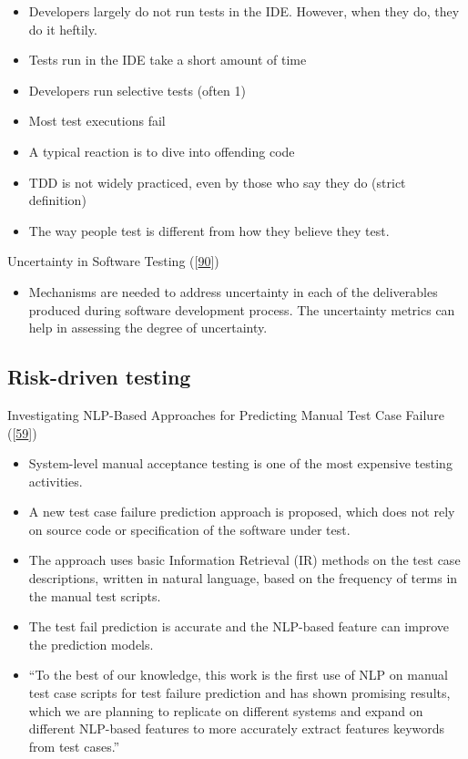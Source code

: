 \documentclass[]{book}
\providecommand{\tightlist}{%
  \setlength{\itemsep}{0pt}\setlength{\parskip}{0pt}}
\begin{document}
\begin{itemize}
\tightlist
\item
  Developers largely do not run tests in the IDE. However, when they do,
  they do it heftily.
\item
  Tests run in the IDE take a short amount of time
\item
  Developers run selective tests (often 1)
\item
  Most test executions fail
\item
  A typical reaction is to dive into offending code
\item
  TDD is not widely practiced, even by those who say they do (strict
  definition)
\item
  The way people test is different from how they believe they test.
\end{itemize}

Uncertainty in Software Testing
({[}\protect\hyperlink{ref-moiz2017uncertainty}{90}{]})

\begin{itemize}
\tightlist
\item
  Mechanisms are needed to address uncertainty in each of the
  deliverables produced during software development process. The
  uncertainty metrics can help in assessing the degree of uncertainty.
\end{itemize}

\subsection{Risk-driven testing}\label{risk-driven-testing}

Investigating NLP-Based Approaches for Predicting Manual Test Case
Failure ({[}\protect\hyperlink{ref-hemmati2018}{59}{]})

\begin{itemize}
\tightlist
\item
  System-level manual acceptance testing is one of the most expensive
  testing activities.
\item
  A new test case failure prediction approach is proposed, which does
  not rely on source code or specification of the software under test.
\item
  The approach uses basic Information Retrieval (IR) methods on the test
  case descriptions, written in natural language, based on the frequency
  of terms in the manual test scripts.
\item
  The test fail prediction is accurate and the NLP-based feature can
  improve the prediction models.
\item
  ``To the best of our knowledge, this work is the first use of NLP on
  manual test case scripts for test failure prediction and has shown
  promising results, which we are planning to replicate on different
  systems and expand on different NLP-based features to more accurately
  extract features keywords from test cases.''
\end{itemize}
\end{document}
